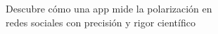 \documentclass[preview]{standalone}
\begin{document}
\begin{center}
Descubre cómo una app mide la polarización en\\redes sociales con precisión y rigor científico
\end{center}
\end{document}
